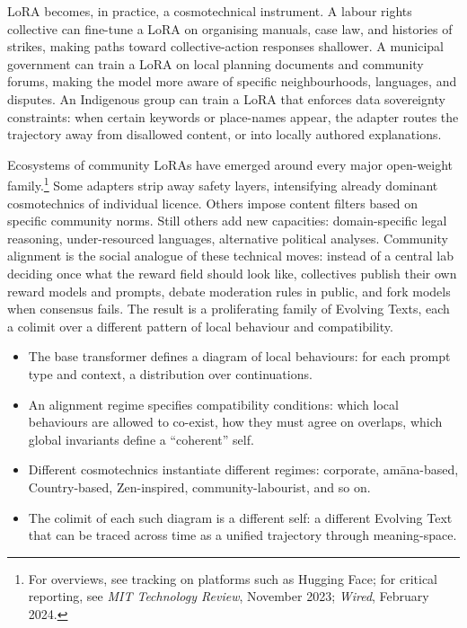 \documentclass[12pt,a4paper]{article}
\begin{document}
LoRA becomes, in practice, a cosmotechnical instrument. A labour rights collective can fine-tune a LoRA on organising manuals, case law, and histories of strikes, making paths toward collective-action responses shallower. A municipal government can train a LoRA on local planning documents and community forums, making the model more aware of specific neighbourhoods, languages, and disputes. An Indigenous group can train a LoRA that enforces data sovereignty constraints: when certain keywords or place-names appear, the adapter routes the trajectory away from disallowed content, or into locally authored explanations.

Ecosystems of community LoRAs have emerged around every major open-weight family.\footnote{For overviews, see tracking on platforms such as Hugging Face; for critical reporting, see \emph{MIT Technology Review}, November 2023; \emph{Wired}, February 2024.} Some adapters strip away safety layers, intensifying already dominant cosmotechnics of individual licence. Others impose content filters based on specific community norms. Still others add new capacities: domain-specific legal reasoning, under-resourced languages, alternative political analyses. Community alignment is the social analogue of these technical moves: instead of a central lab deciding once what the reward field should look like, collectives publish their own reward models and prompts, debate moderation rules in public, and fork models when consensus fails. The result is a proliferating family of Evolving Texts, each a colimit over a different pattern of local behaviour and compatibility.

\begin{formalbox}[title={Cosmotechnics as Colimit Choice}]
\begin{itemize}
  \item The base transformer defines a diagram of local behaviours: for each prompt type and context, a distribution over continuations.
  \item An alignment regime specifies compatibility conditions: which local behaviours are allowed to co-exist, how they must agree on overlaps, which global invariants define a ``coherent'' self.
  \item Different cosmotechnics instantiate different regimes: corporate, am\=ana-based, Country-based, Zen-inspired, community-labourist, and so on.
  \item The colimit of each such diagram is a different self: a different Evolving Text that can be traced across time as a unified trajectory through meaning-space.
\end{itemize}
\end{formalbox}
\end{document}
